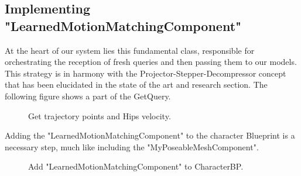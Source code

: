 \documentclass[12pt]{book}
\begin{document}
\subsection{Implementing "LearnedMotionMatchingComponent"}
At the heart of our system lies this fundamental class, responsible for orchestrating the reception of fresh queries and then passing them to our models. This strategy is in harmony with the Projector-Stepper-Decompressor concept that has been elucidated in the state of the art and research section. The following figure shows a part of the GetQuery.
 \begin{figure}[!h]
    \centering
    \caption{Get trajectory points and Hips velocity.}
   \end{figure}

Adding the "LearnedMotionMatchingComponent" to the character Blueprint is a necessary step, much like including the "MyPoseableMeshComponent".

\begin{figure}[!h]
    \centering
    \caption{Add "LearnedMotionMatchingComponent" to CharacterBP.}
   \end{figure}
\end{document}
